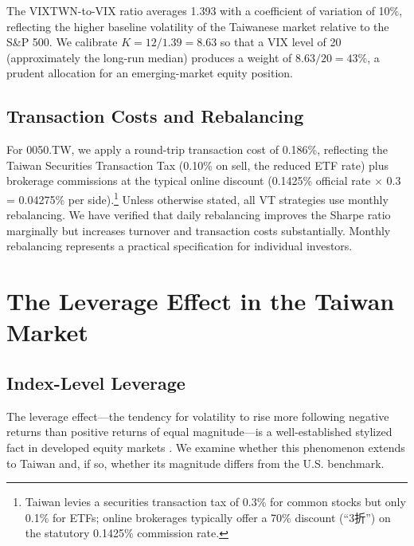 The VIXTWN-to-VIX ratio averages 1.393 with a coefficient of variation of 10\%, reflecting the higher baseline volatility of the Taiwanese market relative to the S\&P 500.%
 We calibrate $K = 12 / 1.39 = 8.63$ so that a VIX level of 20 (approximately the long-run median) produces a weight of $8.63/20 = 43\%$, a prudent allocation for an emerging-market equity position.

\subsection{Transaction Costs and Rebalancing}

For 0050.TW, we apply a round-trip transaction cost of 0.186\%, reflecting the Taiwan Securities Transaction Tax (0.10\% on sell, the reduced ETF rate) plus brokerage commissions at the typical online discount (0.1425\% official rate $\times$ 0.3 = 0.04275\% per side).\footnote{Taiwan levies a securities transaction tax of 0.3\% for common stocks but only 0.1\% for ETFs; online brokerages typically offer a 70\% discount (``3折'') on the statutory 0.1425\% commission rate.} Unless otherwise stated, all VT strategies use monthly rebalancing. We have verified that daily rebalancing improves the Sharpe ratio marginally but increases turnover and transaction costs substantially. Monthly rebalancing represents a practical specification for individual investors.



\section{The Leverage Effect in the Taiwan Market}
\label{sec:leverage}

\subsection{Index-Level Leverage}

The leverage effect---the tendency for volatility to rise more following negative returns than positive returns of equal magnitude---is a well-established stylized fact in developed equity markets \citep{black1976,christie1982,nelson1991,glosten1993}. We examine whether this phenomenon extends to Taiwan and, if so, whether its magnitude differs from the U.S. benchmark.

